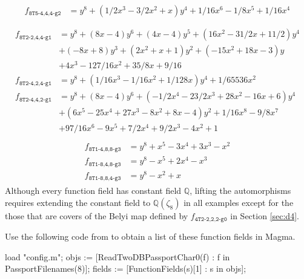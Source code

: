 \documentclass{dcthesis}
\newcommand{\QQ}{\mathbb Q}
\numberwithin{equation}{section}
\theoremstyle{definition}
\theoremstyle{remark}
\begin{document}
{{{\begin{align}
      \label{eqn:d8_444}
      \begin{split}
        f_{\texttt{8T5-4,4,4-g2}}
        &= y^8 + (1/2x^3 - 3/2x^2 + x)y^4 + 1/16x^6 - 1/8x^5 + 1/16x^4\\
      \end{split}
    \end{align}
    \begin{align}
      \label{eqn:d8_244}
      \begin{split}
        f_{\texttt{8T2-2,4,4-g1}}
        &= y^8 + (8x - 4)y^6 + (4x - 4)y^5
        + (16x^2 - 31/2x + 11/2)y^4\\
        &+ (-8x + 8)y^3
        + (2x^2 + x + 1)y^2
        + (-15x^2 + 18x - 3)y\\
        &+ 4x^3 - 127/16x^2 + 35/8x + 9/16\\
        f_{\texttt{8T2-4,2,4-g1}}
        &= y^8 + (1/16x^3 - 1/16x^2 + 1/128x)y^4 + 1/65536x^2\\
        f_{\texttt{8T2-4,4,2-g1}}
        &= y^8 + (8x - 4)y^6 + (-1/2x^4 - 23/2x^3 + 28x^2 - 16x + 6)y^4\\
        &+ (6x^5 - 25x^4 + 27x^3 - 8x^2 + 8x - 4)y^2 + 1/16x^8 - 9/8x^7\\
        &+ 97/16x^6 - 9x^5 + 7/2x^4 + 9/2x^3 - 4x^2 + 1
      \end{split}
    \end{align}
    \begin{align}
      \label{eqn:d8size2}
      \begin{split}
        f_{\texttt{8T1-4,8,8-g3}}
        &= y^8 + x^5 - 3x^4 + 3x^3 - x^2\\
        f_{\texttt{8T1-8,4,8-g3}}
        &= y^8 - x^5 + 2x^4 - x^3\\
        f_{\texttt{8T1-8,8,4-g3}}
        &= y^8 - x^2 + x
      \end{split}
    \end{align}
    Although every function field has
    constant field $\QQ$,
    lifting the automorphisms
    requires extending the constant
    field to $\QQ(\zeta_{8})$
    in all examples except for the
    those that are covers of the
    Belyi map defined by
    $f_{\texttt{4T2-2,2,2-g0}}$
    in Section \ref{sec:d4}.
    \par
    Use the following code from
    \cite{twogroupdessins}
    to obtain a list of these
    function fields in \textsf{Magma}.
    \begin{magma}
load "config.m";
objs := [ReadTwoDBPassportChar0(f) : f in PassportFilenames(8)];
fields := [FunctionFields(s)[1] : s in objs];

\end{magma}}}}
\end{document}
